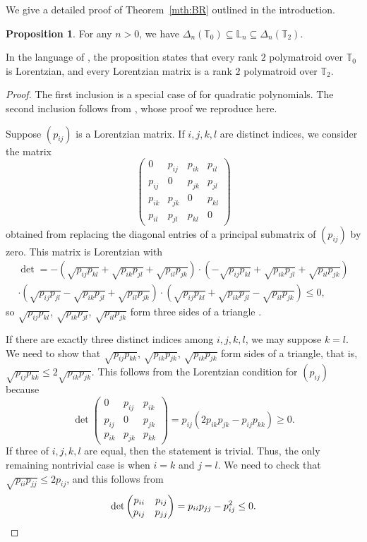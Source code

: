 \documentclass{amsart}
\theoremstyle{definition}
\newtheorem{proposition}[theorem]{Proposition}
\theoremstyle{remark}
\def\T{\mathbb{T}}
\def\L{\mathbb{L}}
\begin{document}
We give a detailed proof of Theorem~\ref{mth:BR} outlined in the introduction.


\begin{proposition}
\label{prop:inclusions}
	For any $n>0$, we have 
    $\Delta_n(\T_0)\subseteq \L_n\subseteq \Delta_n(\T_2)$.
\end{proposition}

In the language of \cite{BHKL-polymatroids}, the proposition states that every rank $2$ polymatroid over $\T_0$ is Lorentzian, and every Lorentzian matrix is a rank $2$ polymatroid over $\T_2$.

\begin{proof}
The first inclusion is a special case of  \cite[Corollary 3.16]{Branden-Huh} for quadratic polynomials. The second inclusion follows from \cite{BHKL-triangular2}, whose proof we reproduce here.

Suppose $(p_{ij})$ is a Lorentzian matrix. If $i,j,k,l$ are distinct indices, we consider the matrix 
\[
\begin{pmatrix}
0 & p_{ij} & p_{ik} & p_{il} \\
p_{ij} & 0 & p_{jk} & p_{jl}  \\
p_{ik} & p_{jk} & 0 & p_{kl}  \\
p_{il} & p_{jl} & p_{kl} & 0
\end{pmatrix} 
\]
obtained from replacing the diagonal entries of a principal submatrix of $(p_{ij})$ by zero. This matrix is Lorentzian with 
\begin{multline*}
\det=-\left(\sqrt{p_{ij}p_{kl}}+\sqrt{p_{ik}p_{jl}}+\sqrt{p_{il}p_{jk}}\right)\cdot(-\sqrt{p_{ij}p_{kl}}+\sqrt{p_{ik}p_{jl}}+\sqrt{p_{il}p_{jk}})\\
      \cdot(\sqrt{p_{ij}p_{jl}}-\sqrt{p_{ik}p_{jl}}+\sqrt{p_{il}p_{jk}})\cdot(\sqrt{p_{ij}p_{kl}}+\sqrt{p_{ik}p_{jl}}-\sqrt{p_{il}p_{jk}}) \le 0,
\end{multline*}
so $\sqrt{p_{ij}p_{kl}}$, $\sqrt{p_{ik}p_{jl}}$, $\sqrt{p_{il}p_{jk}}$ form three sides of a triangle \cite[Proposition 3.1]{HHMWW}.

If there are exactly three distinct indices among $i,j,k,l$, we may suppose $k=l$. 
We need to show that $\sqrt{p_{ij}p_{kk}}$, $\sqrt{p_{ik}p_{jk}}$,
 $\sqrt{p_{ik}p_{jk}}$ form sides of a triangle, that is, $\sqrt{p_{ij}p_{kk}} \le 2\sqrt{p_{ik}p_{jk}}$.
This follows from the Lorentzian condition for $(p_{ij})$ because
\[
\det\begin{pmatrix}
	0 & p_{ij} & p_{ik} \\
	p_{ij} & 0      & p_{jk} \\
	p_{ik} & p_{jk} & p_{kk}
\end{pmatrix}=p_{ij}(2p_{ik}p_{jk}-p_{ij}p_{kk})\ge 0.
\]
If three of $i,j,k,l$ are equal, then the statement is trivial. Thus, the only remaining nontrivial case is when $i=k$ and $j=l$. We need to check that $\sqrt{p_{ii}p_{jj}} \le 2p_{ij}$, and this follows from
\[
\det\begin{pmatrix}
	p_{ii} & p_{ij}  \\
	p_{ij} & p_{jj}      
\end{pmatrix}=p_{ii}p_{jj}-p_{ij}^2\le 0. \qedhere
\]
\end{proof}
\end{document}
